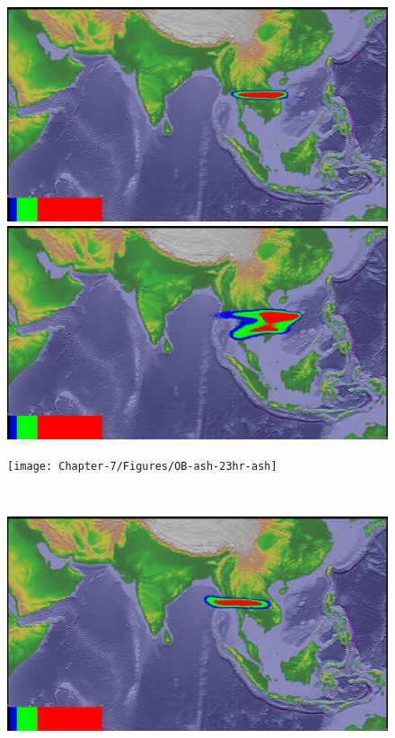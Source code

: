 \begin{figure}[!htb]
    \centering
    \begin{minipage}{.325\textwidth}
        \centering
        \includegraphics[width=0.99 \textwidth]{Chapter-7/Figures/bent-23hr-ash}
    \end{minipage}%
    \begin{minipage}{.325 \textwidth}
        \centering
        \includegraphics[width=0.99 \textwidth]{Chapter-7/Figures/SPH-Plume-23hr-ash}
    \end{minipage}%
    \begin{minipage}{.325 \textwidth}
        \centering
        \texttt{[image: Chapter-7/Figures/OB-ash-23hr-ash]}
    \end{minipage}%
    \\
        \begin{minipage}{.325\textwidth}
        \centering
        \includegraphics[width=0.99 \textwidth]{Chapter-7/Figures/bent-31hr-ash}

\end{minipage}
\end{figure}
